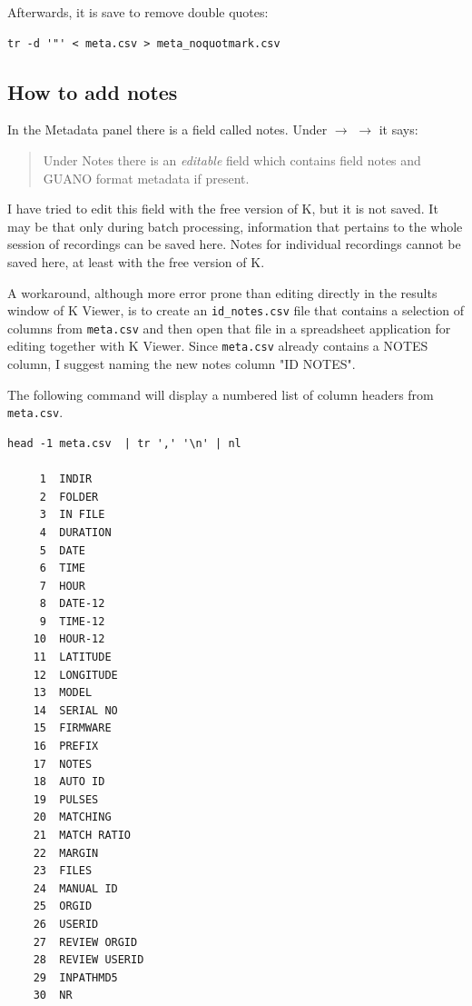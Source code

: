 \documentclass[English, 11pt, twoside, authoryear]{article}
\begin{document}
Afterwards, it is save to remove double quotes:

\begin{lstlisting}[numbers=none]
tr -d '"' < meta.csv > meta_noquotmark.csv
\end{lstlisting}



%
%
%
\subsection{How to add notes}
%
%
%

In the Metadata panel there is a field called notes. Under  $\rightarrow$  $\rightarrow$  it says:
\begin{quote}
Under Notes there is an \emph{editable} field which contains field notes and GUANO format metadata if present.
\end{quote}
I have tried to edit this field with the free version of \textsf{K}, but it is not saved. It may be that only during batch processing, information that pertains to the whole session of recordings can be saved here. Notes for individual recordings cannot be saved here, at least with the free version of \textsf{K}.

A workaround, although more error prone than editing directly in the results window of \textsf{K} Viewer, is to create an \texttt{id\_notes.csv} file that contains a selection of columns from \texttt{meta.csv} and then open that file in a spreadsheet application for editing together with \textsf{K} Viewer. Since \texttt{meta.csv} already contains a NOTES column, I suggest naming the new notes column "ID NOTES".

The following command will display a numbered list of column headers from \texttt{meta.csv}. 

\begin{lstlisting}[numbers=none]
head -1 meta.csv  | tr ',' '\n' | nl

     1	INDIR
     2	FOLDER
     3	IN FILE
     4	DURATION
     5	DATE
     6	TIME
     7	HOUR
     8	DATE-12
     9	TIME-12
    10	HOUR-12
    11	LATITUDE
    12	LONGITUDE
    13	MODEL
    14	SERIAL NO
    15	FIRMWARE
    16	PREFIX
    17	NOTES
    18	AUTO ID
    19	PULSES
    20	MATCHING
    21	MATCH RATIO
    22	MARGIN
    23	FILES
    24	MANUAL ID
    25	ORGID
    26	USERID
    27	REVIEW ORGID
    28	REVIEW USERID
    29	INPATHMD5
    30	NR
\end{lstlisting}
\end{document}
